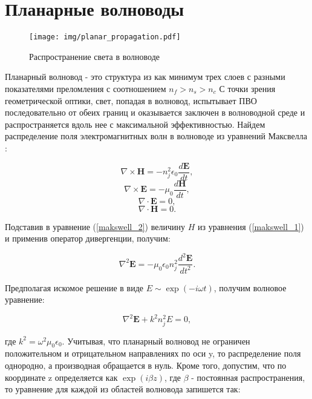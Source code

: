 \section{Планарные волноводы}

\begin{figure}[h!]
\texttt{[image: img/planar\_propagation.pdf]}
\caption{Распространение света в волноводе}
\end{figure}

Планарный волновод - это структура из как минимум трех слоев с разными показателями преломления с соотношением $n_f > n_s > n_c$ С точки зрения геометрической оптики, свет, попадая в волновод, испытывает ПВО последовательно от обеих границ и оказывается заключен в волноводной среде и распространяется вдоль нее с максимальной эффективностью. Найдем распределение поля электромагнитных волн в волноводе из уравнений Максвелла \cite{adams}:

\begin{equation}
 	\nabla\times \mathbf{H} = -n_j^2\epsilon_0 \frac{d\mathbf{E}}{dt},
 	\label{makswell_1}
\end{equation}
\begin{equation}
	\nabla\times \mathbf{E} = -\mu_0\frac{d\mathbf{H}}{dt},
  	\label{makswell_2}
\end{equation}
\begin{equation}
 	\nabla\cdot \mathbf{E} = 0,
 	\label{makswell_3}
\end{equation}
\begin{equation}
 	\nabla\cdot \mathbf{H} = 0.
 	\label{makswell_4} 
\end{equation}

Подставив в уравнение (\ref{makswell_2}) величину $H$ из уравнения (\ref{makswell_1}) и применив оператор дивергенции, получим:

\begin{equation}
	\nabla^2\mathbf{E} = -\mu_0\epsilon_0 n_j^2 \frac{d^2\mathbf{E}}{dt^2}.
\end{equation}

Предполагая искомое решение в виде $E \sim \exp(-i\omega t)$, получим волновое уравнение:

\begin{equation}
	\nabla^2\mathbf{E} + k^2 n_j^2 E = 0,
\end{equation}

где $k^2 = \omega^2\mu_0 \epsilon_0$. Учитывая, что планарный волновод не ограничен положительном и отрицательном направлениях по оси y, то распределение поля однородно, а производная обращается в нуль. Кроме того, допустим, что по координате z определяется как $\exp(i\beta z)$, где $\beta$ - постоянная распространения, то уравнение для каждой из областей волновода запишется так:

